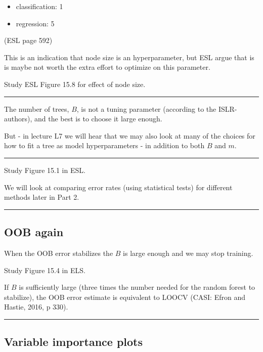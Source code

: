 \documentclass[
  letterpaper,
  DIV=11,
  numbers=noendperiod]{scrartcl}
\providecommand{\tightlist}{%
  \setlength{\itemsep}{0pt}\setlength{\parskip}{0pt}}\usepackage{longtable,booktabs,array}
\begin{document}
\begin{itemize}
\tightlist
\item
  classification: 1
\item
  regression: 5
\end{itemize}

(ESL page 592)

This is an indication that node size is an hyperparameter, but ESL argue
that is is maybe not worth the extra effort to optimize on this
parameter.

Study ESL Figure 15.8 for effect of node size.

\begin{center}\rule{0.5\linewidth}{0.5pt}\end{center}

The number of trees, \(B\), is not a tuning parameter (according to the
ISLR-authors), and the best is to choose it large enough.

But - in lecture L7 we will hear that we may also look at many of the
choices for how to fit a tree as model hyperparameters - in addition to
both \(B\) and \(m\).

\begin{center}\rule{0.5\linewidth}{0.5pt}\end{center}

Study Figure 15.1 in ESL.

We will look at comparing error rates (using statistical tests) for
different methods later in Part 2.

\begin{center}\rule{0.5\linewidth}{0.5pt}\end{center}

\hypertarget{oob-again}{%
\subsection{OOB again}\label{oob-again}}

When the OOB error stabilizes the \(B\) is large enough and we may stop
training.

Study Figure 15.4 in ELS.

If \(B\) is sufficiently large (three times the number needed for the
random forest to stabilize), the OOB error estimate is equivalent to
LOOCV (CASI: Efron and Hastie, 2016, p 330).

\begin{center}\rule{0.5\linewidth}{0.5pt}\end{center}

\hypertarget{variable-importance-plots}{%
\subsection{Variable importance plots}\label{variable-importance-plots}}
\end{document}
